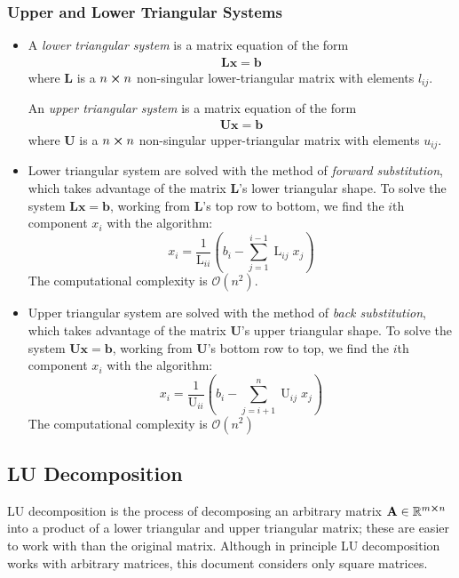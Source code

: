 \documentclass[11pt, a4paper]{article}
\newcommand{\R}{\mathbb{R}} %
\newcommand{\mat}[1]{\mathbf{#1}} %
\begin{document}
\subsubsection{Upper and Lower Triangular Systems}
\begin{itemize}
	\item A \textit{lower triangular system} is a matrix equation of the form 
	\begin{align*}
	 	\mat{L} \bm{x} = \bm{b}
	\end{align*}
	where $ \mat{L} $ is a $ n \cross n $ non-singular lower-triangular matrix with elements $ l_{ij} $.

	An \textit{upper triangular system} is a matrix equation of the form
	\begin{align*}
		 \mat{U} \bm{x} = \bm{b}
	\end{align*}
	where $ \mat{U} $ is a $ n \cross n $ non-singular upper-triangular matrix with elements $ u_{ij} $.
	
	\item Lower triangular system are solved with the method of \textit{forward substitution}, which takes advantage of the matrix $ \mat{L} $'s lower triangular shape. To solve the system $ \mat{L} \bm{x} = \bm{b} $, working from $ \mat{L} $'s top row to bottom, we find the $ i $th component $ x_i $ with the algorithm:
	\begin{equation*}
		x_i = \frac{1}{\operatorname{L}_{ii}} \left(b_i - \sum_{j = 1}^{i-1} \operatorname{L}_{ij} x_j\right)
	\end{equation*}
	The computational complexity is $ \mathcal{O}(n^2) $.
	
	\item Upper triangular system are solved with the method of \textit{back substitution}, which takes advantage of the matrix $ \mat{U} $'s upper triangular shape. To solve the system $ \mat{U} \bm{x} = \bm{b} $, working from $ \mat{U} $'s bottom row to top, we find the $ i $th component $ x_i $ with the algorithm:
	\begin{equation*}
		x_i = \frac{1}{\operatorname{U}_{ii}} \left(b_i - \sum_{j = i + 1}^{n} \operatorname{U}_{ij} x_j\right)
	\end{equation*}
	The computational complexity is $ \mathcal{O}(n^2) $

\end{itemize}

\subsection{LU Decomposition}
LU decomposition is the process of decomposing an arbitrary matrix $ \mat{A} \in \R^{m \cross n} $ into a product of a lower triangular and upper triangular matrix; these are easier to work with than the original matrix. Although in principle LU decomposition works with arbitrary matrices, this document considers only square matrices.
\end{document}
